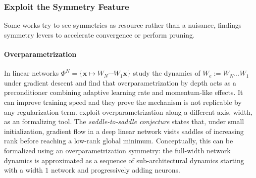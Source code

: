 \documentclass[mathematics,review,submit,moreauthors]{Definitions/mdpi}
\begin{document}
\subsubsection{Exploit the Symmetry Feature}\label{sec:exploit-symmetry-feature}

Some works try to see symmetries as resource rather than a nuisance, findings symmetry levers to accelerate convergence or perform pruning.

\paragraph{Overparametrization}
In linear networks $\Phi^N=\{\mathbf{x}\mapsto W_N\cdots W_1\mathbf{x}\}$ \citet{arora2018p3icml} study the dynamics of $W_e:=W_N\dots W_1$ under gradient descent and find that overparametrization by depth acts as a preconditioner combining adaptive learning rate and momentum-like effects.
It can improve training speed and they prove the mechanism is not replicable by any regularization term.
\citet{jacot2022} exploit overparametrization along a different axis, width, as an formalizing tool.
The \emph{saddle-to-saddle conjecture} states that, under small initialization, gradient flow in a deep linear network visits saddles of increasing rank before reaching a low-rank global minimum.
Conceptually, this can be formalized using an overparametrization symmetry: the full-width network dynamics is approximated as a sequence of sub-architectural dynamics starting with a width $1$ network and progressively adding neurons.
\end{document}
